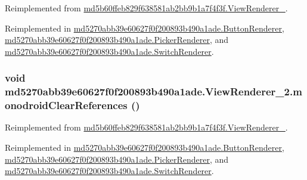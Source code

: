 Reimplemented from \hyperlink{classmd5b60ffeb829f638581ab2bb9b1a7f4f3f_1_1_view_renderer__2_64ca8244a89f60a47c173d9c0b15d610}{md5b60ffeb829f638581ab2bb9b1a7f4f3f.ViewRenderer\_}.

Reimplemented in \hyperlink{classmd5270abb39e60627f0f200893b490a1ade_1_1_button_renderer_777673af96186211dacdc043e03e29c4}{md5270abb39e60627f0f200893b490a1ade.ButtonRenderer}, \hyperlink{classmd5270abb39e60627f0f200893b490a1ade_1_1_picker_renderer_777d5b35ed425b737ed67a6488c800c8}{md5270abb39e60627f0f200893b490a1ade.PickerRenderer}, and \hyperlink{classmd5270abb39e60627f0f200893b490a1ade_1_1_switch_renderer_363c621199304e433d9aec4e62dfb8fa}{md5270abb39e60627f0f200893b490a1ade.SwitchRenderer}.\hypertarget{classmd5270abb39e60627f0f200893b490a1ade_1_1_view_renderer__2_4832372c2c5755cd4e9f279f9b051454}{
\subsubsection[{monodroidClearReferences}]{\setlength{\rightskip}{0pt plus 5cm}void md5270abb39e60627f0f200893b490a1ade.ViewRenderer\_\-2.monodroidClearReferences ()}}
\label{classmd5270abb39e60627f0f200893b490a1ade_1_1_view_renderer__2_4832372c2c5755cd4e9f279f9b051454}




Reimplemented from \hyperlink{classmd5b60ffeb829f638581ab2bb9b1a7f4f3f_1_1_view_renderer__2_dae20979ac761a65aa60c9b427509c37}{md5b60ffeb829f638581ab2bb9b1a7f4f3f.ViewRenderer\_}.

Reimplemented in \hyperlink{classmd5270abb39e60627f0f200893b490a1ade_1_1_button_renderer_85b560fcbb7fbef8f3ec48b9bf724210}{md5270abb39e60627f0f200893b490a1ade.ButtonRenderer}, \hyperlink{classmd5270abb39e60627f0f200893b490a1ade_1_1_picker_renderer_8ea4822897e59386ee80a0fccf40c367}{md5270abb39e60627f0f200893b490a1ade.PickerRenderer}, and \hyperlink{classmd5270abb39e60627f0f200893b490a1ade_1_1_switch_renderer_269d9c853effc1c0864414f6ee8130f3}{md5270abb39e60627f0f200893b490a1ade.SwitchRenderer}.

